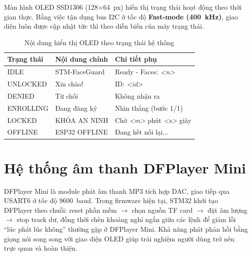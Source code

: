 Màn hình OLED SSD1306 (128$\times$64~px) hiển thị trạng thái hoạt động theo thời gian thực. Bằng việc tận dụng bus I2C ở tốc độ \textbf{Fast-mode (400~kHz)}, giao diện luôn được cập nhật tức thì theo diễn biến của máy trạng thái.

\begin{table}[H]
  \centering
  \caption{Nội dung hiển thị OLED theo trạng thái hệ thống}
  \label{tab:oled_screens}
  \begin{tabular}{l l l}
    \toprule
    \textbf{Trạng thái} & \textbf{Nội dung chính} & \textbf{Chi tiết phụ} \\
    \midrule
    IDLE       & STM-FaceGuard  & Ready - Faces: \textit{<n>} \\
    UNLOCKED   & Xin chào!      & ID: \textit{<id>} \\
    DENIED     & Từ chối        & Không nhận ra \\
    ENROLLING  & Đang đăng ký   & Nhìn thẳng (bước 1/1) \\
    LOCKED     & KHÓA AN NINH   & Chờ \textit{<m>} phút \textit{<s>} giây \\
    OFFLINE    & ESP32 OFFLINE  & Đang kết nối lại... \\
    \bottomrule
  \end{tabular}
\end{table}

\section{Hệ thống âm thanh DFPlayer Mini}
\label{sec:audio}

DFPlayer Mini là module phát âm thanh MP3 tích hợp DAC, giao tiếp qua USART6 ở tốc độ 9600~baud. Trong firmware hiện tại, STM32 khởi tạo DFPlayer theo chuỗi: reset phần mềm $\rightarrow$ chọn nguồn TF card $\rightarrow$ đặt âm lượng $\rightarrow$ stop track dư, đồng thời chèn khoảng nghỉ ngắn giữa các lệnh để giảm lỗi ``lúc phát lúc không'' thường gặp ở DFPlayer Mini. Khả năng phát phản hồi bằng giọng nói song song với giao diện OLED giúp trải nghiệm người dùng trở nên trực quan và hoàn thiện.

